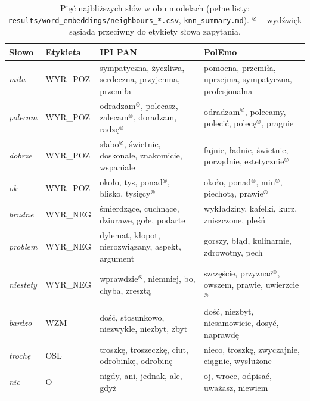 \begin{table}[H]
\centering\small
\begin{tabular}{llp{5.5cm}p{5.5cm}}
\toprule
Słowo & Etykieta & IPI PAN & PolEmo \\
\midrule
\emph{miła} & WYR\_POZ & sympatyczna, życzliwa, serdeczna, przyjemna, przemiła & pomocna, przemiła, uprzejma, sympatyczna, profesjonalna \\
\emph{polecam} & WYR\_POZ & odradzam$^{\otimes}$, polecasz, zalecam$^{\otimes}$, doradzam, radzę$^{\otimes}$ & odradzam$^{\otimes}$, polecamy, polecić, polecę$^{\otimes}$, pragnie \\
\emph{dobrze} & WYR\_POZ & słabo$^{\otimes}$, świetnie, doskonale, znakomicie, wspaniale & fajnie, ładnie, świetnie, porządnie, estetycznie$^{\otimes}$ \\
\emph{ok} & WYR\_POZ & około, tys, ponad$^{\otimes}$, blisko, tysięcy$^{\otimes}$ & około, ponad$^{\otimes}$, min$^{\otimes}$, piechotą, prawie$^{\otimes}$ \\
\emph{brudne} & WYR\_NEG & śmierdzące, cuchnące, dziurawe, gołe, podarte & wykładziny, kafelki, kurz, zniszczone, pleśń \\
\emph{problem} & WYR\_NEG & dylemat, kłopot, nierozwiązany, aspekt, argument & gorszy, błąd, kulinarnie, zdrowotny, pech \\
\emph{niestety} & WYR\_NEG & wprawdzie$^{\otimes}$, niemniej, bo, chyba, zresztą & szczęście, przyznać$^{\otimes}$, owszem, prawie, uwierzcie$^{\otimes}$ \\
\emph{bardzo} & WZM & dość, stosunkowo, niezwykle, niezbyt, zbyt & dość, niezbyt, niesamowicie, dosyć, naprawdę \\
\emph{trochę} & OSL & troszkę, troszeczkę, ciut, odrobinkę, odrobinę & nieco, troszkę, zwyczajnie, ciągnie, wysłużone \\
\emph{nie} & O & nigdy, ani, jednak, ale, gdyż & oj, wroce, odpisać, uważasz, niewiem \\
\bottomrule
\end{tabular}
\caption{Pięć najbliższych słów w obu modelach (pełne listy: \texttt{results/word\_embeddings/neighbours\_*.csv},
\texttt{knn\_summary.md}). $^{\otimes}$ -- wydźwięk sąsiada przeciwny do etykiety słowa zapytania.}
\label{tab:we-knn-examples}
\end{table}
